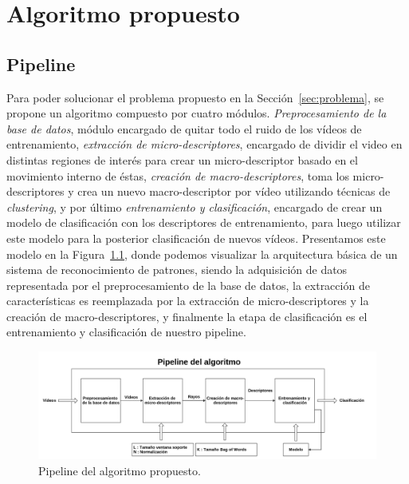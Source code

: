 \chapter[Algoritmo propuesto]{Algoritmo propuesto}
\label{ch:algoritmo}
\section{Pipeline}
\label{sec:pipeline}
Para poder solucionar el problema propuesto en la Sección~\ref{sec:problema}, se propone un algoritmo compuesto por cuatro módulos. \emph{Preprocesamiento de la base de datos}, módulo encargado de quitar todo el ruido de los vídeos de entrenamiento, \emph{extracción de micro-descriptores}, encargado de dividir el video en distintas regiones de interés para crear un micro-descriptor basado en el movimiento interno de éstas, \emph{creación de macro-descriptores}, toma los micro-descriptores y crea un nuevo macro-descriptor por vídeo utilizando técnicas de \textit{clustering}, y por último \emph{entrenamiento y clasificación}, encargado de crear un modelo de clasificación con los descriptores de entrenamiento, para luego utilizar este modelo para la posterior clasificación de nuevos vídeos. Presentamos este modelo en la Figura~\ref{algoritmo:fig:pipeline}, donde podemos visualizar la arquitectura básica de un sistema de reconocimiento de patrones, siendo la adquisición de datos representada por el preprocesamiento de la base de datos, la extracción de características es reemplazada por la extracción de micro-descriptores y la creación de macro-descriptores, y finalmente la etapa de clasificación es el entrenamiento y clasificación de nuestro pipeline.

	\begin{figure}[bt]
		\centering
    		\includegraphics[width=1\textwidth]{Figuras/Diagramas/pipeline.png}
  		\caption{Pipeline del algoritmo propuesto.}
  		\label{algoritmo:fig:pipeline}
	\end{figure}	


